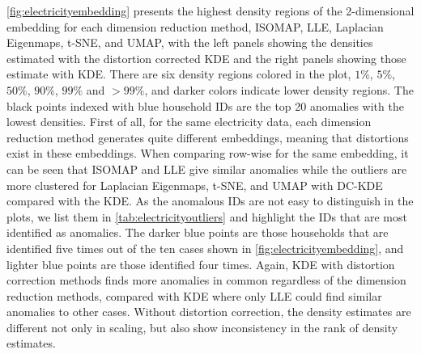\documentclass[11pt,a4paper,]{article}
\begin{document}
\autoref{fig:electricityembedding} presents the highest density regions of the 2-dimensional embedding for each dimension reduction method, ISOMAP, LLE, Laplacian Eigenmaps, t-SNE, and UMAP, with the left panels showing the densities estimated with the distortion corrected KDE and the right panels showing those estimate with KDE. There are six density regions colored in the plot, \(1\%\), \(5\%\), \(50\%\), \(90\%\), \(99\%\) and \(>99\%\), and darker colors indicate lower density regions. The black points indexed with blue household IDs are the top 20 anomalies with the lowest densities. First of all, for the same electricity data, each dimension reduction method generates quite different embeddings, meaning that distortions exist in these embeddings. When comparing row-wise for the same embedding, it can be seen that ISOMAP and LLE give similar anomalies while the outliers are more clustered for Laplacian Eigenmaps, t-SNE, and UMAP with DC-KDE compared with the KDE. As the anomalous IDs are not easy to distinguish in the plots, we list them in \autoref{tab:electricityoutliers} and highlight the IDs that are most identified as anomalies. The darker blue points are those households that are identified five times out of the ten cases shown in \autoref{fig:electricityembedding}, and lighter blue points are those identified four times. Again, KDE with distortion correction methods finds more anomalies in common regardless of the dimension reduction methods, compared with KDE where only LLE could find similar anomalies to other cases. Without distortion correction, the density estimates are different not only in scaling, but also show inconsistency in the rank of density estimates.
\end{document}
